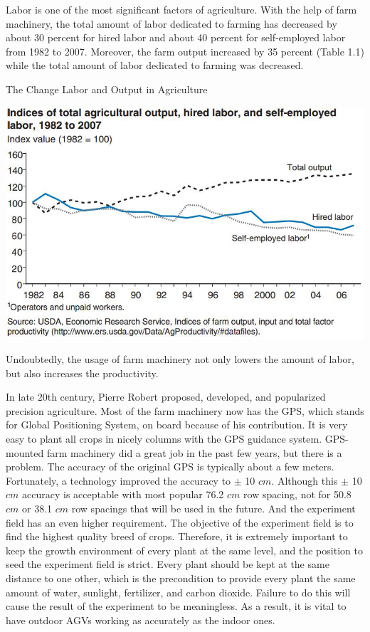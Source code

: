 \documentclass[letterpaper,12pt,oneside]{book}
\begin{document}
		Labor is one of the most significant factors of agriculture. With the help of farm machinery, the total amount of labor dedicated to farming has decreased by about 30 percent for hired labor and about 40 percent for self-employed labor from 1982 to 2007. Moreover, the farm output increased by 35 percent (Table 1.1) while the total amount of labor dedicated to farming was decreased. \cite{o2011changing} %
		\begin{table}[ht!]
			\begin{center}
				\caption{The Change Labor and Output in Agriculture}
				\includegraphics[scale = 0.7]{laborandoutput.jpg}
			\end{center}
		\end{table}
		Undoubtedly, the usage of farm machinery not only lowers the amount of labor, but also increases the productivity. 
		
		In late 20th century, Pierre Robert proposed, developed, and popularized precision agriculture. \cite{mcbratney2005future} Most of the farm machinery now has the GPS, which stands for Global Positioning System, on board because of his contribution. It is very easy to plant all crops in nicely columns with the GPS guidance system. GPS-mounted farm machinery did a great job in the past few years, but there is a problem. The accuracy of the original GPS is typically about a few meters. Fortunately, a technology improved the accuracy to $\pm$ 10 $cm$. \cite{thuilot2002automatic} Although this $\pm$ 10 $cm$ accuracy is acceptable with most popular 76.2 $cm$ row spacing, not for 50.8 $cm$ or 38.1 $cm$ row spacings that will be used in the future. \cite{fawcett2014farm} And the experiment field has an even higher requirement. The objective of the experiment field is to find the highest quality breed of crops. Therefore, it is extremely important to keep the growth environment of every plant at the same level, and the position to seed the experiment field is strict. Every plant should be kept at the same distance to one other, which is the precondition to provide every plant the same amount of water, sunlight, fertilizer, and carbon dioxide. Failure to do this will cause the result of the experiment to be meaningless. As a result, it is vital to have outdoor AGVs working as accurately as the indoor ones.
		
\end{document}
